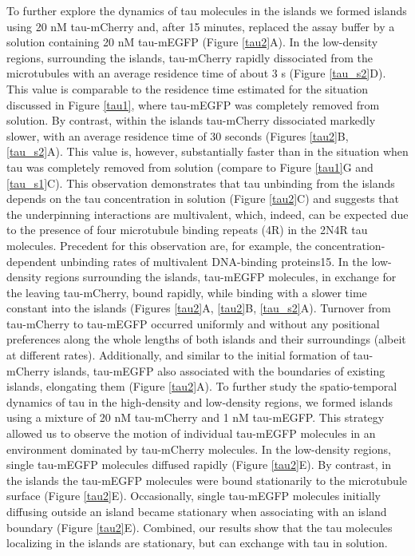 To further explore the dynamics of tau molecules in the islands we formed islands using 20 nM tau-mCherry and, after 15 minutes, replaced the assay buffer by a solution containing 20 nM tau-mEGFP (Figure \ref{tau2}A). In the low-density regions, surrounding the islands, tau-mCherry rapidly dissociated from the microtubules with an average residence time of about 3 s (Figure \ref{tau_s2}D). This value is comparable to the residence time estimated for the situation discussed in Figure \ref{tau1}, where tau-mEGFP was completely removed from solution. By contrast, within the islands tau-mCherry dissociated markedly slower, with an average residence time of 30 seconds (Figures \ref{tau2}B, \ref{tau_s2}A). This value is, however, substantially faster than in the situation when tau was completely removed from solution (compare to Figure \ref{tau1}G and \ref{tau_s1}C). This observation demonstrates that tau unbinding from the islands depends on the tau concentration in solution (Figure \ref{tau2}C) and suggests that the underpinning interactions are multivalent, which, indeed, can be expected due to the presence of four microtubule binding repeats (4R) in the 2N4R tau molecules. Precedent for this observation are, for example, the concentration-dependent unbinding rates of multivalent DNA-binding proteins15. In the low-density regions surrounding the islands, tau-mEGFP molecules, in exchange for the leaving tau-mCherry, bound rapidly, while binding with a slower time constant into the islands (Figures \ref{tau2}A, \ref{tau2}B, \ref{tau_s2}A). Turnover from tau-mCherry to tau-mEGFP occurred uniformly and without any positional preferences along the whole lengths of both islands and their surroundings (albeit at different rates). Additionally, and similar to the initial formation of tau-mCherry islands, tau-mEGFP also associated with the boundaries of existing islands, elongating them (Figure \ref{tau2}A). To further study the spatio-temporal dynamics of tau in the high-density and low-density regions, we formed islands using a mixture of 20 nM tau-mCherry and 1 nM tau-mEGFP. This strategy allowed us to observe the motion of individual tau-mEGFP molecules in an environment dominated by tau-mCherry molecules. In the low-density regions, single tau-mEGFP molecules diffused rapidly (Figure \ref{tau2}E). By contrast, in the islands the tau-mEGFP molecules were bound stationarily to the microtubule surface (Figure \ref{tau2}E). Occasionally, single tau-mEGFP molecules initially diffusing outside an island became stationary when associating with an island boundary (Figure \ref{tau2}E). Combined, our results show that the tau molecules localizing in the islands are stationary, but can exchange with tau in solution.

